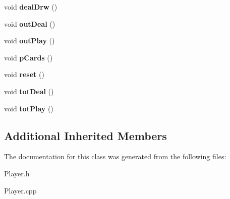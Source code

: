 \begin{DoxyCompactItemize}
void {\bfseries deal\+Drw} ()
\item 
\mbox{\label{class_player_aad397dc762152b76dc722ab32427a230}} 
void {\bfseries out\+Deal} ()
\item 
\mbox{\label{class_player_a772b7191b2f52854682afa59fd213970}} 
void {\bfseries out\+Play} ()
\item 
\mbox{\label{class_player_a3669690f55020fbeb6ab30e869339164}} 
void {\bfseries p\+Cards} ()
\item 
\mbox{\label{class_player_a1af5d39f7bac2aeaa1e30c7dda2332fa}} 
void {\bfseries reset} ()
\item 
\mbox{\label{class_player_a96b0d5033f25f9ec52ca177fd9397339}} 
void {\bfseries tot\+Deal} ()
\item 
\mbox{\label{class_player_a7886f67ac76b150d4350e331b680799b}} 
void {\bfseries tot\+Play} ()
\end{DoxyCompactItemize}
\subsection*{Additional Inherited Members}


The documentation for this class was generated from the following files\+:\begin{DoxyCompactItemize}
\item 
Player.\+h\item 
Player.\+cpp\end{DoxyCompactItemize}
